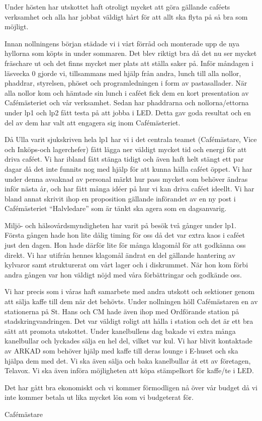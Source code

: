 \documentclass[../_main/handlingar.tex]{subfiles}
\begin{document}
Under hösten har utskottet haft otroligt mycket att göra gällande caféets verksamhet och alla har jobbat väldigt hårt för att allt ska flyta på så bra som möjligt.

Innan nollningens början städade vi i vårt förråd och monterade upp de nya hyllorna som köpts in under sommaren. Det blev riktigt bra då det nu ser mycket fräschare ut och det finns mycket mer plats att ställa saker på. Inför måndagen i läsvecka 0 gjorde vi, tillsammans med hjälp från andra, lunch till alla nollor, phaddrar, styrelsen, phöset och programledningen i form av pastasallader. När alla nollor kom och hämtade sin lunch i caféet fick dem en kort presentation av Cafémästeriet och vår verksamhet. Sedan har phaddrarna och nollorna/ettorna under lp1 och lp2 fått testa på att jobba i LED. Detta gav goda resultat och en del av dem har valt att engagera sig inom Cafémästeriet.

Då Ulla varit sjukskriven hela lp1 har vi i det centrala teamet (Cafémästare, Vice och Inköps-och lagerchefer) fått lägga ner väldigt mycket tid och energi för att driva caféet. Vi har ibland fått stänga tidigt och även haft helt stängt ett par dagar då det inte funnits nog med hjälp för att kunna hålla caféet öppet. Vi har under denna avsaknad av personal märkt hur pass mycket som behöver ändras inför nästa år, och har fått många idéer på hur vi kan driva caféet ideellt. Vi har bland annat skrivit ihop en proposition gällande införandet av en ny post i Cafémästeriet ``Halvledare'' som är tänkt ska agera som en dagsanvarig.

Miljö- och hälsovårdsmyndigheten har varit på besök två gånger under lp1. Första gången hade hon lite dålig timing för oss då det var extra kaos i caféet just den dagen. Hon hade därför lite för många klagomål för att godkänna oss direkt. Vi har utifrån hennes klagomål ändrat en del gällande hantering av kylvaror samt strukturerat om vårt lager och i diskrummet. När hon kom förbi andra gången var hon väldigt nöjd med våra förbättringar och godkände oss.

Vi har precis som i våras haft samarbete med andra utskott och sektioner genom att sälja kaffe till dem när det behövts. Under nollningen höll Cafémästaren en av stationerna på St. Hans och CM hade även ihop med Ordförande station på stadskringvandringen. Det var väldigt roligt att hålla i station och det är ett bra sätt att promota utskottet. Under kanelbullens dag bakade vi extra många kanelbullar och lyckades sälja en hel del, vilket var kul. Vi har blivit kontaktade av ARKAD som behöver hjälp med kaffe till deras lounge i E-huset och ska hjälpa dem med det. Vi ska även sälja och baka kanelbullar åt ett av företagen, Telavox. Vi ska även införa möjligheten att köpa stämpelkort för kaffe/te i LED.

Det har gått bra ekonomiskt och vi kommer förmodligen nå över vår budget då vi inte kommer betala ut lika mycket lön som vi budgeterat för.

\begin{signatures}{1}
    \mvh
    \signature{Daniel Bakic}{Cafémästare}
\end{signatures}
\end{document}
